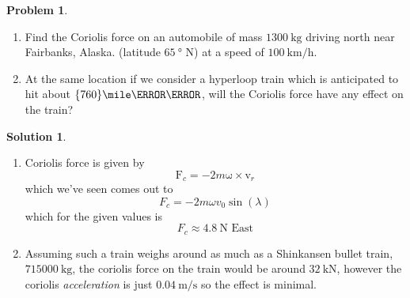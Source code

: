 \documentclass[10pt]{article}
\theoremstyle{definition}
\newtheorem{problem}{Problem}
\newtheorem{soln}{Solution}
\newcommand{\bv}[1]{\bm{\mathrm{#1}}}
\begin{document}
\begin{problem}~
\begin{enumerate}[label=(\roman*)]
  \item Find the Coriolis force on an automobile of mass $\qty{1300}{\kilo\gram}$ driving north near Fairbanks,
        Alaska. (latitude $\qty{65}{\degree}$ N) at a speed of $\qty{100}{\kilo\meter\per\hour}$.
  \item At the same location if we consider a hyperloop train which is anticipated to hit about $\qty{760}{\mile\per\hour}$,
        will the Coriolis force have any effect on the train?
\end{enumerate}
\end{problem}
\begin{soln}~
  \begin{enumerate}[label=(\roman*)]
    \item Coriolis force is given by
          $$\bv{F}_c=-2m\bv{\omega}\times \bv{v}_r$$
          which we've seen comes out to
          $$F_c=-2m\omega v_0\sin(\lambda)$$
          which for the given values is
          $$F_c\approx \qty{4.8}{\newton}\text{ East}$$
    \item Assuming such a train weighs around as much as a Shinkansen bullet train, $\qty{715000}{\kilo\gram}$, the coriolis
          force on the train would be around $\qty{32}{\kilo\newton}$, however the coriolis \emph{acceleration} is just $\qty{0.04}{\meter\per\second}$ so the
          effect is minimal.
  \end{enumerate}
\end{soln}
\end{document}
